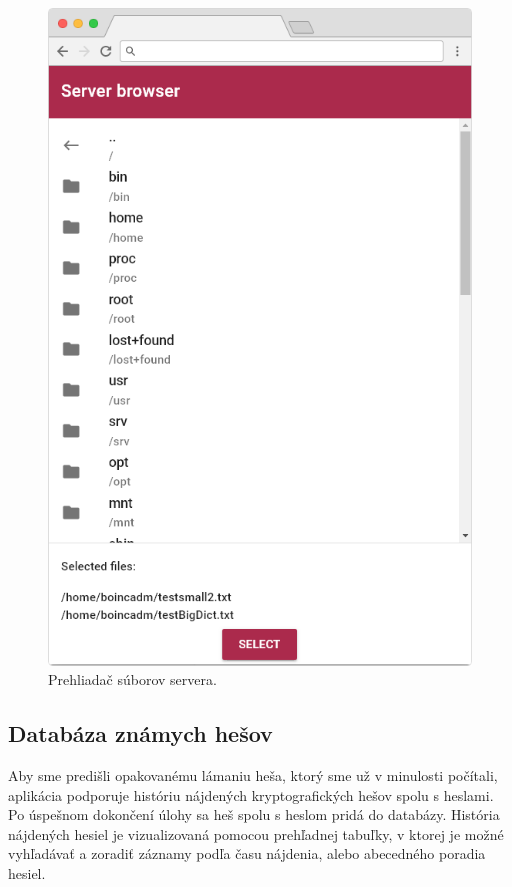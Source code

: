 \documentclass[slovak]{fitthesis}
\begin{document}
\begin{figure}[H]
    \centering
    \includegraphics[scale=0.4]{obrazky/serverBrowserFrame.PNG}
    \caption{Prehliadač súborov servera.}
    \label{fig:serverBrowser}
\end{figure}

\subsection{Databáza známych hešov}
Aby sme predišli opakovanému lámaniu heša, ktorý sme už v minulosti počítali, aplikácia podporuje históriu nájdených kryptografických hešov spolu s heslami. Po úspešnom dokončení úlohy sa heš spolu s heslom pridá do databázy. História nájdených hesiel je vizualizovaná pomocou prehľadnej tabuľky, v ktorej je možné vyhľadávať a zoradiť záznamy podľa času nájdenia, alebo abecedného poradia hesiel.
\end{document}
